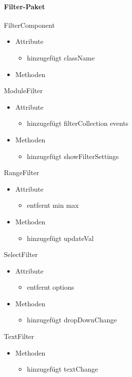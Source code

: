 \paragraph{Filter-Paket}

FilterComponent
	\begin{itemize}
		\item Attribute		
			\begin{itemize}
				\item hinzugefügt
					\subitem className
			\end{itemize}
		\item Methoden
	\end{itemize}
ModuleFilter
	\begin{itemize}
		\item Attribute		
			\begin{itemize}
				\item hinzugefügt
					\subitem filterCollection
					\subitem events
			\end{itemize}
		\item Methoden
			\begin{itemize}
				\item hinzugefügt
					\subitem showFilterSettings
			\end{itemize}
	\end{itemize}

RangeFilter
	\begin{itemize}
		\item Attribute
			\begin{itemize}
				\item entfernt
					\subitem min
					\subitem max
			\end{itemize}
		\item Methoden
			\begin{itemize}
				\item hinzugefügt
					\subitem updateVal
			\end{itemize}
	\end{itemize}

SelectFilter
	\begin{itemize}
		\item Attribute
			\begin{itemize}
				\item entfernt
					\subitem options
			\end{itemize}
		\item Methoden
			\begin{itemize}
				\item hinzugefügt
					\subitem dropDownChange
			\end{itemize}
	\end{itemize}

TextFilter
	\begin{itemize}
		\item Methoden
		\begin{itemize}
			\item hinzugefügt
				\subitem textChange
		\end{itemize}
	\end{itemize}
